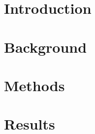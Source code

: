 \chapter{Introduction}


\chapter{Background}











\chapter{Methods}







%
%


\chapter{Results}





\printbibliography
\cleardoublepage

\begin{appendices}

	
\end{appendices}




